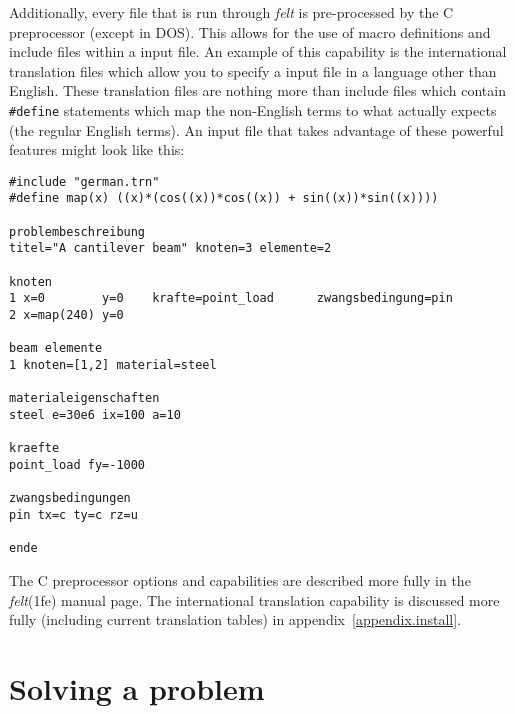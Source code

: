Additionally, every \felt{} file that is run through {\em felt} is 
pre-processed by the C preprocessor (except in DOS).  This allows for the use 
of macro definitions and include files within a \felt{} input file.  An example
of this capability is the international translation files which allow you
to specify a \felt{} input file in a language other than English.  These
translation files are nothing more than include files which contain 
{\tt \#define}
statements which map the non-English terms to what \felt{} actually expects 
(the regular English terms).  An input file that takes advantage of these
powerful features might look like this:
\begin{screen}
 \begin{verbatim}
#include "german.trn"
#define map(x) ((x)*(cos((x))*cos((x)) + sin((x))*sin((x))))

problembeschreibung
titel="A cantilever beam" knoten=3 elemente=2 

knoten
1 x=0        y=0    krafte=point_load      zwangsbedingung=pin
2 x=map(240) y=0                           

beam elemente
1 knoten=[1,2] material=steel

materialeigenschaften
steel e=30e6 ix=100 a=10

kraefte
point_load fy=-1000

zwangsbedingungen
pin tx=c ty=c rz=u

ende
 \end{verbatim}
\end{screen}
The C preprocessor options and 
capabilities are described more fully in the {\em felt}(1fe) manual page.
The international translation capability is
discussed more fully (including current translation tables) 
in appendix~\ref{appendix.install}.

\section{Solving a problem}
\label{felt_prog.solve}

